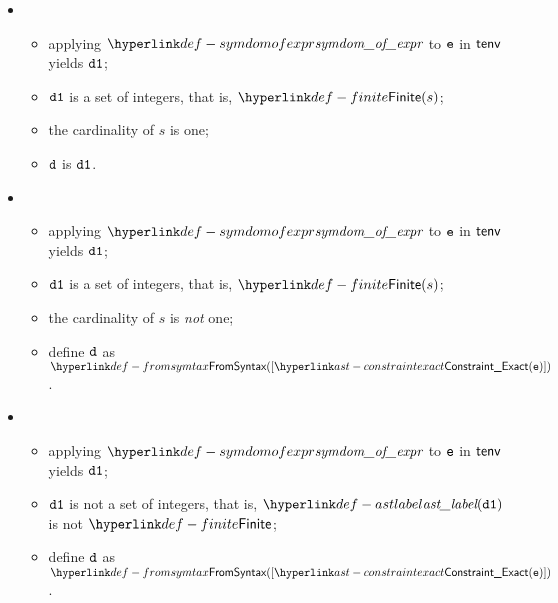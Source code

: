 \ProseParagraph
\OneApplies
\begin{itemize}
  \item {}
  \begin{itemize}
    \item applying $\symdomofexpr$ to $\ve$ in $\tenv$ yields $\vdone$;
    \item $\vdone$ is a set of integers, that is, $\Finite(s)$;
    \item the cardinality of $s$ is one;
    \item $\vd$ is $\vdone$.
  \end{itemize}

  \item {}
  \begin{itemize}
    \item applying $\symdomofexpr$ to $\ve$ in $\tenv$ yields $\vdone$;
    \item $\vdone$ is a set of integers, that is, $\Finite(s)$;
    \item the cardinality of $s$ is \emph{not} one;
    \item define $\vd$ as $\FromSyntax([\ConstraintExact(\ve)])$.
  \end{itemize}

  \item {}
  \begin{itemize}
    \item applying $\symdomofexpr$ to $\ve$ in $\tenv$ yields $\vdone$;
    \item $\vdone$ is not a set of integers, that is, $\astlabel(\vdone)$ is not $\Finite$;
    \item define $\vd$ as $\FromSyntax([\ConstraintExact(\ve)])$.
  \end{itemize}
\end{itemize}

\FormallyParagraph
\begin{mathpar}
\end{mathpar}

\begin{mathpar}
\end{mathpar}


